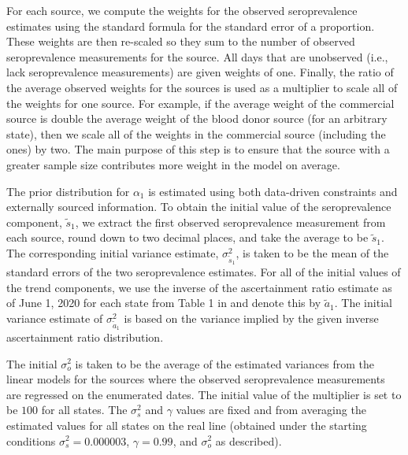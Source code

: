 \documentclass{article}
\begin{document}
For each source, we compute the weights for the observed seroprevalence
estimates using the standard formula for the standard error of a proportion.
These weights are then re-scaled so they sum to the number of observed
seroprevalence measurements for the source. All days that are unobserved (i.e.,
lack seroprevalence measurements) are given weights of one. Finally, the ratio
of the average observed weights for the sources is used as a multiplier to scale
all of the weights for one source. For example, if the average weight of the
commercial source is double the average weight of the blood donor source (for an
arbitrary state), then we scale all of the weights in the commercial source
(including the ones) by two. The main purpose of this step is to ensure that
the source with a greater sample size contributes more weight in the model on
average. %

The prior distribution for $\alpha_1$ is estimated using both data-driven constraints 
and externally sourced information. To obtain the initial value of the seroprevalence 
component, $\tilde{s}_{1}$, we extract the first observed seroprevalence measurement from 
each source, round down to two decimal places, and take the average to be $\tilde{s}_{1}$. 
The corresponding initial
variance estimate, $\sigma^2_{\tilde{s}_{1}}$, is taken to be the mean of the standard
errors of the two seroprevalence estimates. For all of the initial values of the trend 
components, we use the inverse of the ascertainment ratio estimate as of June 1, 2020 
for each state from Table 1 in \citet{unwin2020state} and denote this by $\tilde{a}_1$. The
initial variance estimate of $\sigma^2_{\tilde{a}_1}$ is based on the variance implied 
by the given inverse ascertainment ratio distribution.

The initial $\sigma^2_o$ is taken to be the average of the estimated variances
from the linear models for the sources where the observed seroprevalence
measurements are regressed on the enumerated dates. The initial value of 
the multiplier is set to be $100$ for all states. The $\sigma^2_s$ and $\gamma$ 
values are fixed and from averaging the estimated values for all states on the real line
(obtained under the starting conditions $\sigma^2_s = 0.000003$, $\gamma = 0.99$,
and $\sigma^2_o$ as described).
\end{document}
